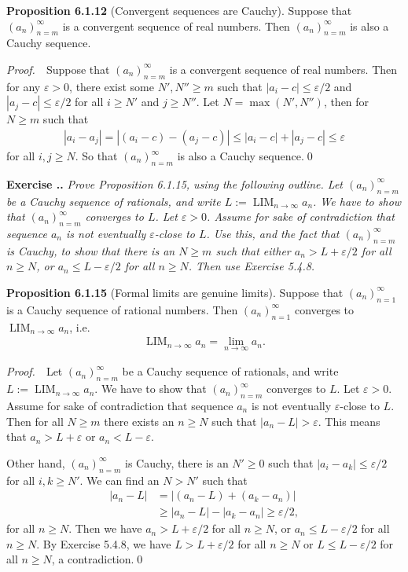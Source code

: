 \documentclass{book}
\DeclareMathOperator{\tlim}{LIM}%
\newcommand{\pff}{\vspace{.25em}\noindent\emph{Proof.}~~}
\newcommand{\titl}[1]{\noindent\textbf{#1}}
\newcounter{Exercise}[section]
\renewcommand{\theExercise}{\thesection.\arabic{Exercise}.}
\newcommand{\new}{\vspace{1.5em}\noindent\textbf{{Exercise \stepcounter{Exercise}\textbf{\theExercise}}} }
\begin{document}
\begin{framed}
\titl{Proposition 6.1.12} (Convergent sequences are Cauchy). Suppose that $(a_n)_{n=m}^{\infty}$ is a convergent sequence of real numbers. Then $(a_n)_{n=m}^{\infty}$ is also a Cauchy sequence.
\end{framed}

\pff Suppose that $(a_n)_{n=m}^\infty$ is a convergent sequence of real numbers. Then for any $\varepsilon>0$, there exist some $N',N''\geq m$ such that $|a_i-c|\leq\varepsilon/2$ and $|a_j-c|\leq\varepsilon/2$ for all $i\geq N'$ and $j\geq N''$. Let $N=\max(N',N'')$, then for $N\geq m$ such that
    \begin{align*}
        |a_i-a_j|=|(a_i-c)-(a_j-c)|\leq |a_i-c|+|a_j-c|\leq\varepsilon
    \end{align*}
for all $i,j\geq N$. So that $(a_n)_{n=m}^\infty$ is also a Cauchy sequence.\qed

\new\emph{Prove Proposition 6.1.15, using the following outline. Let $(a_n)_{n=m}^\infty$ be a Cauchy sequence of rationals, and write $L:=\tlim_{n\to\infty}a_n$. We have to show that $(a_n)_{n=m}^\infty$ converges to $L$. Let $\varepsilon>0$. Assume for sake of contradiction that sequence $a_n$ is not eventually $\varepsilon$-close to $L$. Use this, and the fact that $(a_n)_{n=m}^\infty$ is Cauchy, to show that there is an $N\geq m$ such that either $a_n>L+\varepsilon/2$ for all $n\geq N$, or $a_n\leq L-\varepsilon/2$ for all $n\geq N$. Then use Exercise 5.4.8.}

\begin{framed}
\titl{Proposition 6.1.15} (Formal limits are genuine limits). Suppose that $(a_n)_{n=1}^{\infty}$ is a Cauchy sequence of rational numbers. Then $(a_n)_{n=1}^{\infty}$ converges to $\tlim_{n\to\infty}a_n$, i.e.
    \begin{align*}
        \tlim_{n\to\infty}a_n=\lim_{n\to\infty}a_n.
    \end{align*}
\end{framed}

\pff Let $(a_n)_{n=m}^\infty$ be a Cauchy sequence of rationals, and write $L:=\tlim_{n\to\infty}a_n$.  We have to show that $(a_n)_{n=m}^\infty$ converges to $L$. Let $\varepsilon>0$. Assume for sake of contradiction that sequence $a_n$ is not eventually $\varepsilon$-close to $L$. Then for all $N\geq m$ there exists an $n\geq N$ such that $|a_n-L|>\varepsilon$. This means that $a_n>L+\varepsilon$ or $a_n<L-\varepsilon$.

Other hand, $(a_n)_{n=m}^\infty$ is Cauchy, there is an $N'\geq 0$ such that $|a_i-a_k|\leq\varepsilon/2$ for all $i,k\geq N'$. We can find an $N>N'$ such that 
    \begin{align*}
        |a_n-L|&=|(a_n-L)+(a_k-a_n)|\\
        &\geq|a_n-L|-|a_k-a_n|\geq\varepsilon/2,
    \end{align*}
for all $n\geq N$. Then we have $a_n>L+\varepsilon/2$ for all $n\geq N$, or $a_n\leq L-\varepsilon/2$ for all $n\geq N$. By Exercise 5.4.8, we have $L>L+\varepsilon/2$ for all $n\geq N$ or $L\leq L-\varepsilon/2$ for all $n\geq N$, a contradiction.\qed
\end{document}
